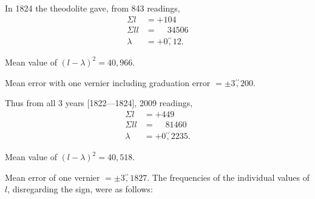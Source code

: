 \par\noindent\hspace*{\parindent}In 1824 the theodolite gave, from 843 readings,
\[
\begin{aligned}
\Sigma l&=+104\\
\Sigma ll&=\phantom{+}34506\\
\lambda&=+0\overset{\prime\prime}{,}12.
\end{aligned}
\]
\par\noindent\hspace*{\parindent}Mean value of $(l-\lambda)^2=40{,}966$.
\par\noindent\hspace*{\parindent}Mean error with one vernier including graduation error $=\pm3\overset{\prime\prime}{,}200$.
\par\noindent\hspace*{\parindent}Thus from all 3 years [1822---1824], 2009 readings,
\[
\begin{aligned}
\Sigma l&=+449\\
\Sigma ll&=\phantom{+}81460\\
\lambda&=+0\overset{\prime\prime}{,}2235.
\end{aligned}
\]
\par\noindent\hspace*{\parindent}Mean value of $(l-\lambda)^2=40{,}518$.
\par\noindent\hspace*{\parindent}Mean error of one vernier $=\pm3\overset{\prime\prime}{,}1827$. The frequencies of the individual values of $l$, disregarding the sign, were as follows:

